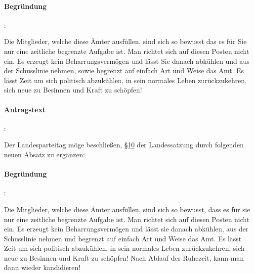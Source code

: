 
\paragraph{Begründung}:

Die Mitglieder, welche diese Ämter ausfüllen, sind sich so bewusst das es für Sie nur eine zeitliche begrenzte Aufgabe ist. Man richtet sich auf diesen Posten nicht ein. Es erzeugt kein Beharrungsvermögen und lässt Sie danach abkühlen und aus der Schusslinie nehmen, sowie begrenzt auf einfach Art und Weise das Amt. Es lässt Zeit um sich politisch abzukühlen, in sein normales Leben zurückzukehren, sich neue zu Besinnen und Kraft zu schöpfen!



\paragraph{Antragstext}:

Der Landesparteitag möge beschließen, \href{http://wiki.piratenpartei.de/LSA:Satzung#.C2.A7_10_-_Bewerberaufstellung_f.C3.BCr_die_Wahlen_zu_Volksvertretungen}{§10} der Landessatzung durch folgenden neuen Absatz zu ergänzen:


\paragraph{Begründung}:

Die Mitglieder, welche diese Ämter ausfüllen, sind sich so bewusst, dass es für sie nur eine zeitliche begrenzte Aufgabe ist. Man richtet sich auf diesen Posten nicht ein. Es erzeugt kein Beharrungsvermögen und lässt sie danach abkühlen, aus der Schusslinie nehmen und begrenzt auf einfach Art und Weise das Amt. Es lässt Zeit um sich politisch abzukühlen, in sein normales Leben zurückzukehren, sich neue zu Besinnen und Kraft zu schöpfen! Nach Ablauf der Ruhezeit, kann man dann wieder kandidieren!

